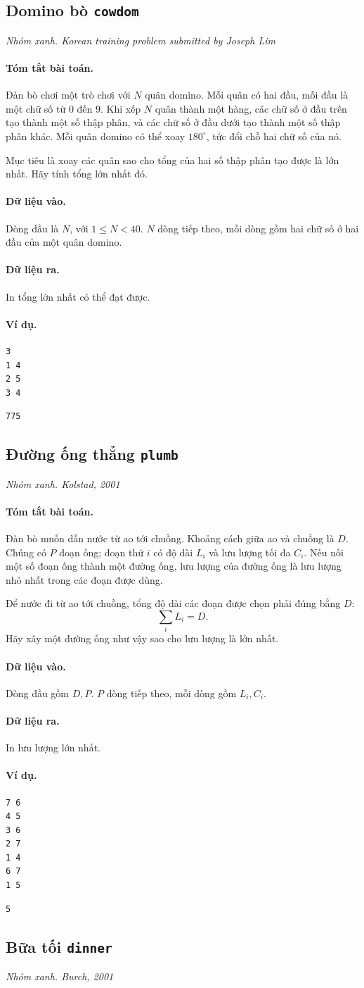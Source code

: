 \documentclass[11pt]{article}
\newcommand{\problem}[4]{%
  \subsection[#1 (#2)]{#1 \hfill {\normalsize\texttt{#2}}}%
  \noindent\textit{#3. #4}\par\smallskip
}
\newcommand{\iosec}[1]{\paragraph{#1}}
\begin{document}
\problem{Domino bò}{cowdom}{Nhóm xanh}{Korean training problem submitted by Joseph Lim}

\iosec{Tóm tắt bài toán.}
Đàn bò chơi một trò chơi với \(N\) quân domino. Mỗi quân có hai đầu, mỗi đầu
là một chữ số từ \(0\) đến \(9\). Khi xếp \(N\) quân thành một hàng, các chữ số
ở đầu trên tạo thành một số thập phân, và các chữ số ở đầu dưới tạo thành một
số thập phân khác. Mỗi quân domino có thể xoay \(180^\circ\), tức đổi chỗ hai
chữ số của nó.

Mục tiêu là xoay các quân sao cho tổng của hai số thập phân tạo được là lớn
nhất. Hãy tính tổng lớn nhất đó.

\iosec{Dữ liệu vào.}
Dòng đầu là \(N\), với \(1\le N<40\). \(N\) dòng tiếp theo, mỗi dòng gồm hai
chữ số ở hai đầu của một quân domino.

\iosec{Dữ liệu ra.}
In tổng lớn nhất có thể đạt được.

\iosec{Ví dụ.}
\begin{verbatim}
3
1 4
2 5
3 4
\end{verbatim}

\begin{verbatim}
775
\end{verbatim}

\problem{Đường ống thẳng}{plumb}{Nhóm xanh}{Kolstad, 2001}

\iosec{Tóm tắt bài toán.}
Đàn bò muốn dẫn nước từ ao tới chuồng. Khoảng cách giữa ao và chuồng là \(D\).
Chúng có \(P\) đoạn ống; đoạn thứ \(i\) có độ dài \(L_i\) và lưu lượng tối đa
\(C_i\). Nếu nối một số đoạn ống thành một đường ống, lưu lượng của đường ống
là lưu lượng nhỏ nhất trong các đoạn được dùng.

Để nước đi từ ao tới chuồng, tổng độ dài các đoạn được chọn phải đúng bằng
\(D\):
\[
  \sum_i L_i = D.
\]
Hãy xây một đường ống như vậy sao cho lưu lượng là lớn nhất.

\iosec{Dữ liệu vào.}
Dòng đầu gồm \(D,P\). \(P\) dòng tiếp theo, mỗi dòng gồm \(L_i,C_i\).

\iosec{Dữ liệu ra.}
In lưu lượng lớn nhất.

\iosec{Ví dụ.}
\begin{verbatim}
7 6
4 5
3 6
2 7
1 4
6 7
1 5
\end{verbatim}

\begin{verbatim}
5
\end{verbatim}

\problem{Bữa tối}{dinner}{Nhóm xanh}{Burch, 2001}
\end{document}
